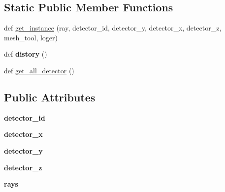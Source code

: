 \subsection*{Static Public Member Functions}
\begin{DoxyCompactItemize}
\item 
def \hyperlink{classMIS_1_1Muon__Imaging__Algorithm_1_1InvDataTools_1_1calculate_1_1Detector_1_1Detector_a035d318164fc5ec0d9aaa6d51934204b}{get\+\_\+instance} (ray, detector\+\_\+id, detector\+\_\+y, detector\+\_\+x, detector\+\_\+z, mesh\+\_\+tool, loger)
\item 
\mbox{\label{classMIS_1_1Muon__Imaging__Algorithm_1_1InvDataTools_1_1calculate_1_1Detector_1_1Detector_aa022d280162c6d335d5ea565f7f33b4b}} 
def {\bfseries distory} ()
\item 
def \hyperlink{classMIS_1_1Muon__Imaging__Algorithm_1_1InvDataTools_1_1calculate_1_1Detector_1_1Detector_a729a002be09a4514141f4826cfaf6135}{get\+\_\+all\+\_\+detector} ()
\end{DoxyCompactItemize}
\subsection*{Public Attributes}
\begin{DoxyCompactItemize}
\item 
\mbox{\label{classMIS_1_1Muon__Imaging__Algorithm_1_1InvDataTools_1_1calculate_1_1Detector_1_1Detector_ac064322d98a415413a3501117bc4ef27}} 
{\bfseries detector\+\_\+id}
\item 
\mbox{\label{classMIS_1_1Muon__Imaging__Algorithm_1_1InvDataTools_1_1calculate_1_1Detector_1_1Detector_a53b51e11d5d919b6d921d675309aa43e}} 
{\bfseries detector\+\_\+x}
\item 
\mbox{\label{classMIS_1_1Muon__Imaging__Algorithm_1_1InvDataTools_1_1calculate_1_1Detector_1_1Detector_a403887f2eefa59390926128b94dc68c2}} 
{\bfseries detector\+\_\+y}
\item 
\mbox{\label{classMIS_1_1Muon__Imaging__Algorithm_1_1InvDataTools_1_1calculate_1_1Detector_1_1Detector_a184df54c8c2ef59ede1cd56d2c97dcb4}} 
{\bfseries detector\+\_\+z}
\item 
\mbox{\label{classMIS_1_1Muon__Imaging__Algorithm_1_1InvDataTools_1_1calculate_1_1Detector_1_1Detector_a3da72777cd997f5c272c0e9668b1684f}} 
{\bfseries rays}
\end{DoxyCompactItemize}


